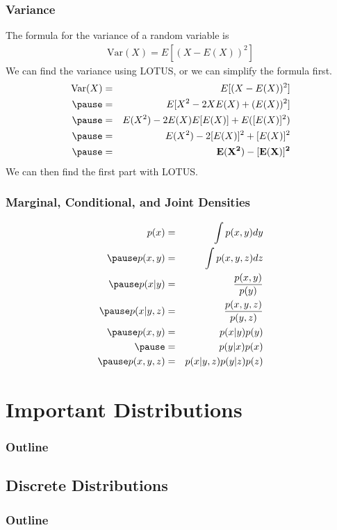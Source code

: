 \documentclass{beamer}
\begin{document}
\begin{frame}
\frametitle{Variance}
\pause
The formula for the variance of a random variable is 
\begin{eqnarray*}
\mathrm{Var}(X) = E[(X - E(X))^2]
\end{eqnarray*}
\pause
We can find the variance using LOTUS, \pause or we can simplify the
formula first.
\pause
\begin{eqnarray*}
\mathrm{Var}(X) &=& E[(X - E(X))^2]\\
\pause
&=& E[X^2 - 2 X E(X) + (E(X))^2]\\
\pause
&=& E(X^2) - 2 E(X) E[E(X)] + E([E(X)]^2)\\
\pause
&=& E(X^2) - 2 [E(X)]^2 + [E(X)]^2\\
\pause
&=& \mathbf{E(X^2) - [E(X)]^2}
\end{eqnarray*}
\pause
We can then find the first part with LOTUS.
\end{frame}

\begin{frame}
\frametitle{Marginal, Conditional, and Joint Densities}
\pause
\begin{eqnarray*}
p(x) &=& \int p(x,y) dy\\
\pause
p(x,y) &=& \int p(x,y,z) dz\\
\pause
p(x|y) &=& \frac{p(x,y)}{p(y)}\\
\pause
p(x|y,z) &=& \frac{p(x,y,z)}{p(y,z)}\\
\pause
p(x,y) &=& p(x | y) p(y)\\
\pause
&=& p(y | x) p(x) \\
\pause
p(x,y,z) &=& p(x | y,z) p(y|z) p(z)
\end{eqnarray*}
\end{frame}



\section{Important Distributions}


\begin{frame}
\frametitle{Outline}
\tableofcontents[currentsection]
\end{frame}

\subsection{Discrete Distributions}


\begin{frame}
\frametitle{Outline}
\tableofcontents[currentsubsection]
\end{frame}
\end{document}
